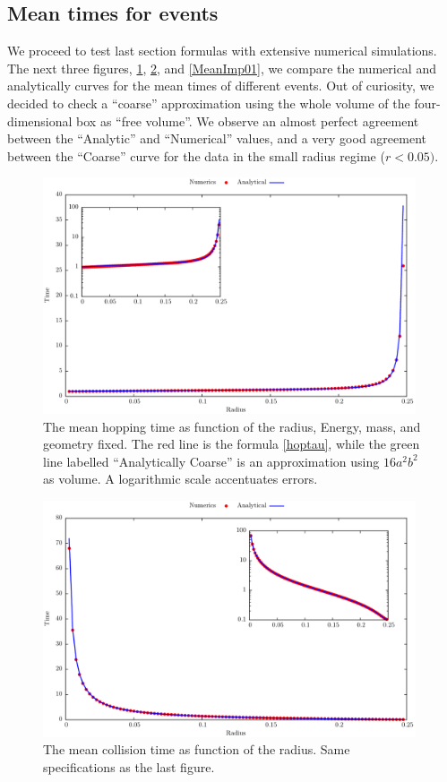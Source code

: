 \documentclass[a4paper,10pt, jcp, aps, preprint]{revtex4-1}
\begin{document}
\subsection{Mean times for events}

We proceed to test last section formulas with
extensive numerical simulations.
The next three figures, \ref{MeanHopp01}, \ref{MeanCol01}, and \ref{MeanImp01},  
we compare the
numerical and analytically curves for the mean times of different events.
Out of curiosity, we decided to check a ``coarse'' approximation
using the whole volume of the four-dimensional box as ``free volume''. 
We observe an almost perfect agreement between the ``Analytic'' and ``Numerical''
values, and a very good agreement between the ``Coarse'' curve for the
data in the small radius regime ($r<0.05)$.

\begin{figure}[h]
  \centering
  \includegraphics[width=0.98\textwidth]{./FigurasPerfectas/HopTimesAgain01-ForPaper.pdf}
  \caption{The mean hopping time as function of the radius, Energy, mass, 
and geometry fixed.
The red line is the formula \ref{hoptau}, while the green line
labelled ``Analytically Coarse'' is an approximation using
 $16a^2b^2$ as volume. A logarithmic scale accentuates errors.}\label{MeanHopp01}
\end{figure}

\begin{figure}[h]
  \centering
  \includegraphics[width=0.98\textwidth]{./FigurasPerfectas/CollitionsErgodic02-ForPaper.pdf}
  \caption{The mean collision time as function of the radius. Same
    specifications as the last figure. }\label{MeanCol01}
\end{figure}
\end{document}
